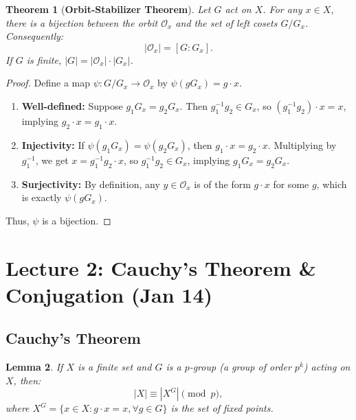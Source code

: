 \documentclass[a4paper,12pt]{article}
\newtheorem{thm}{Theorem}[section]
\newtheorem{lem}[thm]{Lemma}
\begin{document}
\begin{thm}[\textbf{Orbit-Stabilizer Theorem}]
    Let $G$ act on $X$. For any $x \in X$, there is a bijection between the orbit $\mathcal{O}_x$ and the set of left cosets $G/G_x$. Consequently:
    \[ |\mathcal{O}_x| = [G : G_x]. \]
    If $G$ is finite, $|G| = |\mathcal{O}_x| \cdot |G_x|$.
\end{thm}
\begin{proof}
    Define a map $\psi: G/G_x \to \mathcal{O}_x$ by $\psi(gG_x) = g \cdot x$.
    \begin{enumerate}
        \item \textbf{Well-defined:} Suppose $g_1 G_x = g_2 G_x$. Then $g_1^{-1}g_2 \in G_x$, so $(g_1^{-1}g_2) \cdot x = x$, implying $g_2 \cdot x = g_1 \cdot x$.
        \item \textbf{Injectivity:} If $\psi(g_1 G_x) = \psi(g_2 G_x)$, then $g_1 \cdot x = g_2 \cdot x$. Multiplying by $g_1^{-1}$, we get $x = g_1^{-1}g_2 \cdot x$, so $g_1^{-1}g_2 \in G_x$, implying $g_1 G_x = g_2 G_x$.
        \item \textbf{Surjectivity:} By definition, any $y \in \mathcal{O}_x$ is of the form $g \cdot x$ for some $g$, which is exactly $\psi(gG_x)$.
    \end{enumerate}
    Thus, $\psi$ is a bijection.
\end{proof}
% 

\newpage
\section{Lecture 2: Cauchy's Theorem \& Conjugation (Jan 14)}

\subsection{Cauchy's Theorem}

\begin{lem}
    If $X$ is a finite set and $G$ is a $p$-group (a group of order $p^k$) acting on $X$, then:
    \[ |X| \equiv |X^{G}| \pmod{p}, \]
    where $X^G = \{x \in X : g \cdot x = x, \forall g \in G\}$ is the set of fixed points.
\end{lem}
\end{document}
